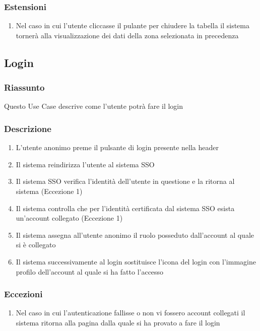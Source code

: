        \subsubsection{Estensioni}
            \begin{enumerate}
                \item Nel caso in cui l'utente cliccasse il pulante per chiudere la tabella il sistema tornerà alla visualizzazione dei dati della zona selezionata in precedenza
            \end{enumerate}

    \subsection{Login} %
        \subsubsection{Riassunto}
            Questo Use Case descrive come l'utente potrà fare il login
        \subsubsection{Descrizione}
            \begin{enumerate}
                \item L'utente anonimo preme il pulsante di login presente nella header
                \item Il sistema reindirizza l'utente al sistema SSO
                \item Il sistema SSO verifica l'identità dell'utente in questione e la ritorna al sistema (Eccezione 1)
                \item Il sistema controlla che per l'identità certificata dal sistema SSO esista un'account collegato (Eccezione 1)
                \item Il sistema assegna all'utente anonimo il ruolo posseduto dall'account al quale si è collegato
                \item Il sistema successivamente al login sostituisce l'icona del login con l'immagine profilo dell'account al quale si ha fatto l'accesso
            \end{enumerate}
        \subsubsection{Eccezioni}
            \begin{enumerate}
                \item Nel caso in cui l'autenticazione fallisse o non vi fossero account collegati il sistema ritorna alla pagina dalla quale si ha provato a fare il login
            \end{enumerate}


